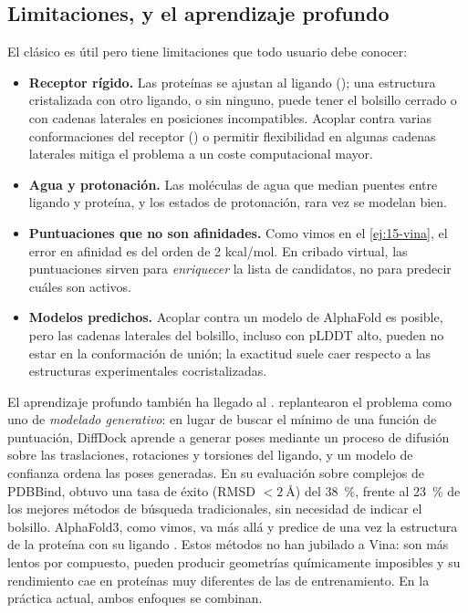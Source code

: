 \subsection{Limitaciones, y el aprendizaje profundo}

El  clásico es útil pero tiene limitaciones que todo usuario debe conocer:

\begin{itemize}
  \item \textbf{Receptor rígido.} Las proteínas se ajustan al ligando (); una estructura cristalizada con otro ligando, o sin ninguno, puede tener el bolsillo cerrado o con cadenas laterales en posiciones incompatibles. Acoplar contra varias conformaciones del receptor () o permitir flexibilidad en algunas cadenas laterales mitiga el problema a un coste computacional mayor.
  \item \textbf{Agua y protonación.} Las moléculas de agua que median puentes entre ligando y proteína, y los estados de protonación, rara vez se modelan bien.
  \item \textbf{Puntuaciones que no son afinidades.} Como vimos en el \cref{ej:15-vina}, el error en afinidad es del orden de 2 kcal/mol. En cribado virtual, las puntuaciones sirven para \emph{enriquecer} la lista de candidatos, no para predecir cuáles son activos.
  \item \textbf{Modelos predichos.} Acoplar contra un modelo de AlphaFold es posible, pero las cadenas laterales del bolsillo, incluso con pLDDT alto, pueden no estar en la conformación de unión; la exactitud suele caer respecto a las estructuras experimentales cocristalizadas.
\end{itemize}

El aprendizaje profundo también ha llegado al . \textcite{c15-corso2023} replantearon el problema como uno de \emph{modelado generativo}: en lugar de buscar el mínimo de una función de puntuación, DiffDock aprende a generar poses mediante un proceso de difusión sobre las traslaciones, rotaciones y torsiones del ligando, y un modelo de confianza ordena las poses generadas. En su evaluación sobre complejos de PDBBind, obtuvo una tasa de éxito  (RMSD $<\SI{2}{\angstrom}$) del \SI{38}{\percent}, frente al \SI{23}{\percent} de los mejores métodos de búsqueda tradicionales, sin necesidad de indicar el bolsillo. AlphaFold3, como vimos, va más allá y predice de una vez la estructura de la proteína con su ligando \parencite{c15-abramson2024}. Estos métodos no han jubilado a Vina: son más lentos por compuesto, pueden producir geometrías químicamente imposibles y su rendimiento cae en proteínas muy diferentes de las de entrenamiento. En la práctica actual, ambos enfoques se combinan.

